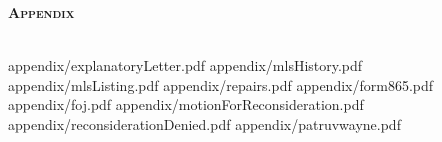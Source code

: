 \documentclass[12pt,\documentclassflag]{article}
\begin{document}
\newpage 

\begin{centering}
  \bf\scshape Appendix \\~\\
  \rm 
\end{centering}

\tableofcontents
\newpage
\renewcommand{\footrulewidth}{0.4pt}
\renewcommand{\subsectionmark}[1]{\markright{/#1}} %

\newcommand{\addLabelsToAllIncludedPages}[1]{%
   \refstepcounter{includepdfpage}%
   \stepcounter{currentpagecounter}%
   \label{#1.\thecurrentpagecounter}}%

\newcommand{\myincludepdf}[2]{%
  \setcounter{currentpagecounter}{0}%
  {appendix/#1.pdf}}%
  
  
\renewcommand{\sectionmark}[1]{\markboth{#1}{/Explanatory Letter}} %
\myincludepdf{explanatoryLetter}{1,section,1,Submitted Evidence,evidence,1,subsection,2,Explanatory Letter}
\myincludepdf{mlsHistory}{1,subsection,2,MLS History}
\myincludepdf{mlsListing}{1,subsection,2,MLS Listing Sheet}
\myincludepdf{repairs}{1,subsection,2,List of Repairs}
\myincludepdf{form865}{1,subsection,2,Form 865 Mathieu Gast Nonconsideration}
\renewcommand{\sectionmark}[1]{\markboth{#1}{}} %
\myincludepdf{foj}{1,section,1,Final Opinion and Judgement}
\myincludepdf{motionForReconsideration}{1,section,1,Motion For Reconsideration}
\myincludepdf{reconsiderationDenied}{1,section,1,Reconsideration Denied}
\myincludepdf{patruvwayne}{1,section,1,Patru v Wayne}

\newpage\empty%
\end{document}
